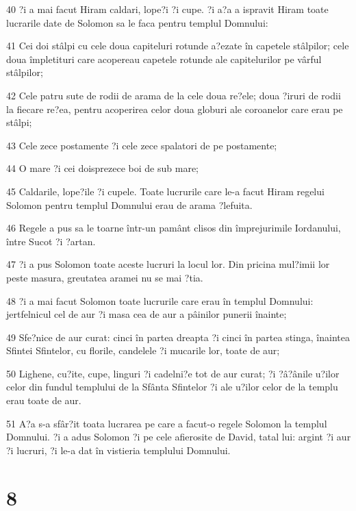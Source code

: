 \par 40 ?i a mai facut Hiram caldari, lope?i ?i cupe. ?i a?a a ispravit Hiram toate lucrarile date de Solomon sa le faca pentru templul Domnului:
\par 41 Cei doi stâlpi cu cele doua capiteluri rotunde a?ezate în capetele stâlpilor; cele doua împletituri care acopereau capetele rotunde ale capitelurilor pe vârful stâlpilor;
\par 42 Cele patru sute de rodii de arama de la cele doua re?ele; doua ?iruri de rodii la fiecare re?ea, pentru acoperirea celor doua globuri ale coroanelor care erau pe stâlpi;
\par 43 Cele zece postamente ?i cele zece spalatori de pe postamente;
\par 44 O mare ?i cei doisprezece boi de sub mare;
\par 45 Caldarile, lope?ile ?i cupele. Toate lucrurile care le-a facut Hiram regelui Solomon pentru templul Domnului erau de arama ?lefuita.
\par 46 Regele a pus sa le toarne într-un pamânt clisos din împrejurimile Iordanului, între Sucot ?i ?artan.
\par 47 ?i a pus Solomon toate aceste lucruri la locul lor. Din pricina mul?imii lor peste masura, greutatea aramei nu se mai ?tia.
\par 48 ?i a mai facut Solomon toate lucrurile care erau în templul Domnului: jertfelnicul cel de aur ?i masa cea de aur a pâinilor punerii înainte;
\par 49 Sfe?nice de aur curat: cinci în partea dreapta ?i cinci în partea stinga, înaintea Sfintei Sfintelor, cu florile, candelele ?i mucarile lor, toate de aur;
\par 50 Lighene, cu?ite, cupe, linguri ?i cadelni?e tot de aur curat; ?i ?â?ânile u?ilor celor din fundul templului de la Sfânta Sfintelor ?i ale u?ilor celor de la templu erau toate de aur.
\par 51 A?a s-a sfâr?it toata lucrarea pe care a facut-o regele Solomon la templul Domnului. ?i a adus Solomon ?i pe cele afierosite de David, tatal lui: argint ?i aur ?i lucruri, ?i le-a dat în vistieria templului Domnului.

\chapter{8}

